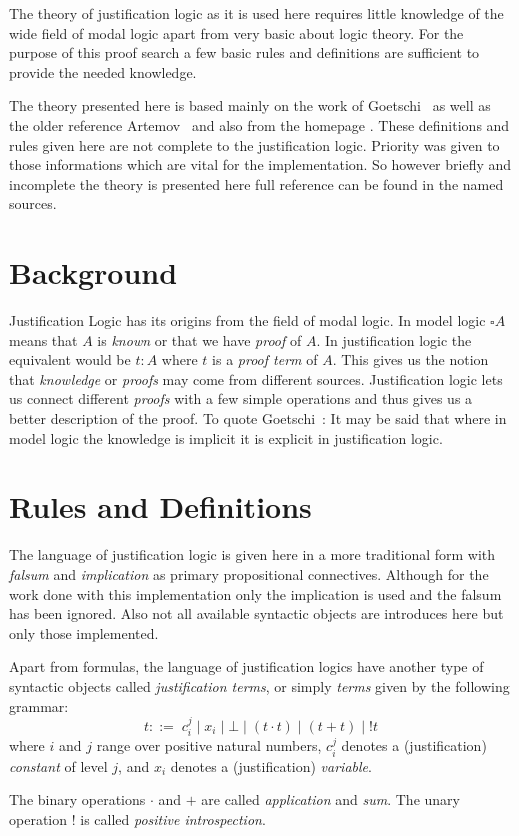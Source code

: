 The theory of justification logic as it is used here requires little knowledge of the wide field of modal logic apart from very basic about logic theory. For the purpose of this proof search a few basic rules and definitions are sufficient to provide the needed knowledge. 

The theory presented here is based mainly on the work of Goetschi~\cite{goet} as well as the older reference Artemov~\cite{art} and also from the homepage \cite{stan}. These definitions and rules given here are not complete to the justification logic. Priority was given to those informations which are vital for the implementation. So however briefly and incomplete the theory is presented here full reference can be found in the named sources. 

\section{Background}
Justification Logic has its origins from the field of modal logic. 
In model logic $\square A$ means that $A$ is \emph{known} or that we have \emph{proof} of $A$. In justification logic the equivalent would be $t:A$ where $t$ is a \emph{proof term} of $A$. This gives us the notion that \emph{knowledge} or \emph{proofs} may come from different sources. Justification logic lets us connect different \emph{proofs} with a few simple operations and thus gives us a better description of the proof. To quote Goetschi~\cite{goet}: It may be said that where in model logic the knowledge is implicit it is explicit in justification logic.

\section{Rules and Definitions}

The language of justification logic is given here in a more traditional form with \emph{falsum} and \emph{implication} as primary propositional connectives. Although for the work done with this implementation only the implication is used and the falsum has been ignored. Also not all available syntactic objects are introduces here but only those implemented.

\begin{definition}\label{justification_terms} Apart from formulas, the language of justification logics have another type of syntactic objects called \emph{justification terms}, or simply \emph{terms} given by the following grammar:
\[
	t::=  \;c_{i}^{j}\; |\; x_i \;|\; \bot \; |\; (t \cdot t)\; |\; (t+t)\; |\; !t
\]
where $i$ and $j$ range over positive natural numbers, $c_{i}^{j}$ denotes a (justification) \emph{constant} of level $j$, and $x_i$ denotes a (justification) \emph{variable}.

The binary operations $\cdot$ and $+$ are called \emph{application} and \emph{sum}. The unary operation $!$ is called \emph{positive introspection}.
\end{definition}

